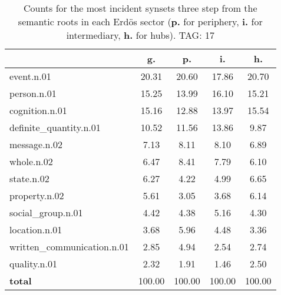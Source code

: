 \begin{table}[h!]
\begin{center}
\begin{tabular}{| l | c | c | c | c |}\hline
 & g. & p. & i. & h. \\\hline
event.n.01 & 20.31  & 20.60  & 17.86  & 20.70 \\\hline
person.n.01 & 15.25  & 13.99  & 16.10  & 15.21 \\\hline
cognition.n.01 & 15.16  & 12.88  & 13.97  & 15.54 \\\hline
definite\_quantity.n.01 & 10.52  & 11.56  & 13.86  & 9.87 \\\hline
message.n.02 & 7.13  & 8.11  & 8.10  & 6.89 \\\hline
whole.n.02 & 6.47  & 8.41  & 7.79  & 6.10 \\\hline
state.n.02 & 6.27  & 4.22  & 4.99  & 6.65 \\\hline
property.n.02 & 5.61  & 3.05  & 3.68  & 6.14 \\\hline
social\_group.n.01 & 4.42  & 4.38  & 5.16  & 4.30 \\\hline
location.n.01 & 3.68  & 5.96  & 4.48  & 3.36 \\\hline
written\_communication.n.01 & 2.85  & 4.94  & 2.54  & 2.74 \\\hline
quality.n.01 & 2.32  & 1.91  & 1.46  & 2.50 \\\hline
{{\bf total}} & 100.00  & 100.00  & 100.00  & 100.00 \\\hline
\end{tabular}
\caption{Counts for the most incident synsets three step from the semantic roots in each Erd\"os sector ({\bf p.} for periphery, {\bf i.} for intermediary, {\bf h.} for hubs). TAG: 17}
\end{center}
\end{table}